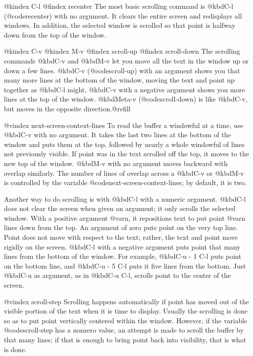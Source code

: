 {{{{{{{{@kindex C-l
@findex recenter
  The most basic scrolling command is @kbd{C-l} (@code{recenter}) with no
argument.  It clears the entire screen and redisplays all windows.  In
addition, the selected window is scrolled so that point is halfway down
from the top of the window.

@kindex C-v
@kindex M-v
@findex scroll-up
@findex scroll-down
  The scrolling commands @kbd{C-v} and @kbd{M-v} let you move all the text
in the window up or down a few lines.  @kbd{C-v} (@code{scroll-up}) with an
argument shows you that many more lines at the bottom of the window, moving
the text and point up together as @kbd{C-l} might.  @kbd{C-v} with a
negative argument shows you more lines at the top of the window.
@kbd{Meta-v} (@code{scroll-down}) is like @kbd{C-v}, but moves in the
opposite direction.@refill

@vindex next-screen-context-lines
  To read the buffer a windowful at a time, use @kbd{C-v} with no argument.
It takes the last two lines at the bottom of the window and puts them at
the top, followed by nearly a whole windowful of lines not previously
visible.  If point was in the text scrolled off the top, it moves to the
new top of the window.  @kbd{M-v} with no argument moves backward with
overlap similarly.  The number of lines of overlap across a @kbd{C-v} or
@kbd{M-v} is controlled by the variable @code{next-screen-context-lines}; by
default, it is two.

  Another way to do scrolling is with @kbd{C-l} with a numeric argument.
@kbd{C-l} does not clear the screen when given an argument; it only scrolls
the selected window.  With a positive argument @var{n}, it repositions text
to put point @var{n} lines down from the top.  An argument of zero puts
point on the very top line.  Point does not move with respect to the text;
rather, the text and point move rigidly on the screen.  @kbd{C-l} with a
negative argument puts point that many lines from the bottom of the window.
For example, @kbd{C-u - 1 C-l} puts point on the bottom line, and @kbd{C-u
- 5 C-l} puts it five lines from the bottom.  Just @kbd{C-u} as argument,
as in @kbd{C-u C-l}, scrolls point to the center of the screen.

@vindex scroll-step
  Scrolling happens automatically if point has moved out of the visible
portion of the text when it is time to display.  Usually the scrolling is
done so as to put point vertically centered within the window.  However, if
the variable @code{scroll-step} has a nonzero value, an attempt is made to
scroll the buffer by that many lines; if that is enough to bring point back
into visibility, that is what is done.

}}}}}}}}
